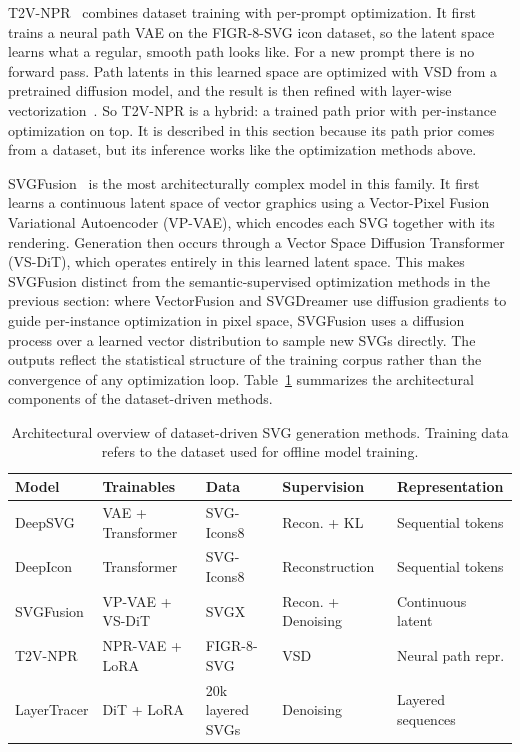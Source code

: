 T2V-NPR~\cite{zhangTexttoVectorGenerationNeural2024} combines dataset training
with per-prompt optimization. It first trains a neural path VAE
on the FIGR-8-SVG icon dataset, so the latent space learns
what a regular, smooth path looks like. For a new prompt there is
no forward pass. Path latents in this learned space are optimized
with VSD from a pretrained diffusion model, and the result is then
refined with layer-wise vectorization~\cite{zhangTexttoVectorGenerationNeural2024}.
So T2V-NPR is a hybrid: a trained path prior with per-instance
optimization on top. It is described in this section because its
path prior comes from a dataset, but its inference works like
the optimization methods above.

SVGFusion~\cite{xingSVGFusionScalableTexttoSVG2025} is the most architecturally
complex model in this family. It first learns a continuous
latent space of vector graphics using a Vector-Pixel Fusion
Variational Autoencoder (VP-VAE), which encodes each SVG
together with its rendering. Generation
then occurs through a Vector Space Diffusion Transformer
(VS-DiT), which operates entirely in this learned latent
space. This makes SVGFusion distinct from the
semantic-supervised optimization methods in the previous
section: where VectorFusion and SVGDreamer use diffusion
gradients to guide per-instance optimization in pixel space,
SVGFusion uses a diffusion process over a learned vector
distribution to sample new SVGs directly. The outputs
reflect the statistical structure of the training corpus
rather than the convergence of any optimization loop. 
Table~\ref{tab:arch_dataset} summarizes the 
architectural components of the dataset-driven 
methods.

\begin{table}[htbp]
\centering
\caption{Architectural overview of dataset-driven 
SVG generation methods. Training data refers to 
the dataset used for offline model training.}
\label{tab:arch_dataset}
\footnotesize
\begin{tabularx}{\textwidth}{@{}l l l l X@{}}
\toprule
\textbf{Model} & \textbf{Trainables} & \textbf{Data} 
& \textbf{Supervision} & \textbf{Representation} \\
\midrule
DeepSVG      & VAE + Transformer   & SVG-Icons8       
             & Recon. + KL         & Sequential tokens \\
DeepIcon     & Transformer         & SVG-Icons8       
             & Reconstruction      & Sequential tokens \\
SVGFusion    & VP-VAE + VS-DiT     & SVGX             
             & Recon. + Denoising  & Continuous latent \\
T2V-NPR      & NPR-VAE + LoRA      & FIGR-8-SVG       
             & VSD                 & Neural path repr. \\
LayerTracer  & DiT + LoRA          & 20k layered SVGs 
             & Denoising           & Layered sequences \\
\bottomrule
\end{tabularx}
\end{table}

